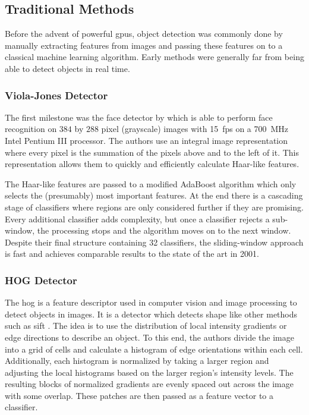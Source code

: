 \documentclass[draft,final]{vutinfth} %
\begin{document}
\subsection{Traditional Methods}
\label{ssec:obj-traditional}

Before the advent of powerful \glspl{gpu}, object detection was
commonly done by manually extracting features from images and passing
these features on to a classical machine learning algorithm. Early
methods were generally far from being able to detect objects in real
time.

\subsubsection{Viola-Jones Detector}
\label{sssec:obj-viola-jones}

The first milestone was the face detector by
\textcite{viola2001,viola2001} which is able to perform face
recognition on $384$ by $288$ pixel (grayscale) images with
\qty{15}{fps} on a \qty{700}{\MHz} Intel Pentium III processor. The
authors use an integral image representation where every pixel is the
summation of the pixels above and to the left of it. This
representation allows them to quickly and efficiently calculate
Haar-like features.

The Haar-like features are passed to a modified AdaBoost
algorithm \cite{freund1995} which only selects the (presumably) most
important features. At the end there is a cascading stage of
classifiers where regions are only considered further if they are
promising. Every additional classifier adds complexity, but once a
classifier rejects a sub-window, the processing stops and the
algorithm moves on to the next window. Despite their final structure
containing 32 classifiers, the sliding-window approach is fast and
achieves comparable results to the state of the art in 2001.

\subsubsection{HOG Detector}
\label{sssec:obj-hog}

The \gls{hog} \cite{dalal2005} is a feature descriptor used in
computer vision and image processing to detect objects in images. It
is a detector which detects shape like other methods such as
\gls{sift} \cite{lowe1999}. The idea is to use the distribution of
local intensity gradients or edge directions to describe an object. To
this end, the authors divide the image into a grid of cells and
calculate a histogram of edge orientations within each
cell. Additionally, each histogram is normalized by taking a larger
region and adjusting the local histograms based on the larger region's
intensity levels. The resulting blocks of normalized gradients are
evenly spaced out across the image with some overlap. These patches
are then passed as a feature vector to a classifier.
\end{document}
